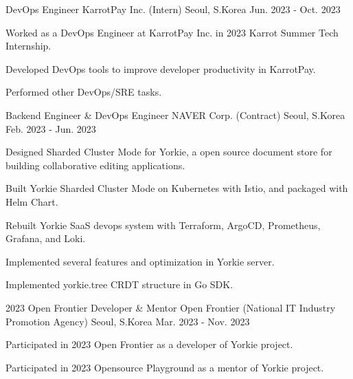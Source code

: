 

\begin{cventries}

\cventry
    {DevOps Engineer} %
    {KarrotPay Inc. (Intern)} %
    {Seoul, S.Korea} %
    {Jun. 2023 - Oct. 2023} %
    {
      \begin{cvitems} %
        \item {Worked as a DevOps Engineer at KarrotPay Inc. in 2023 Karrot Summer Tech Internship.}
        \item {Developed DevOps tools to improve developer productivity in KarrotPay.}
        \item {Performed other DevOps/SRE tasks.}
      \end{cvitems}
    }

  \cventry
    {Backend Engineer \& DevOps Engineer} %
    {NAVER Corp. (Contract)} %
    {Seoul, S.Korea} %
    {Feb. 2023 - Jun. 2023} %
    {
      \begin{cvitems} %
        \item {Designed Sharded Cluster Mode for Yorkie, a open source document store for building collaborative editing applications.}
        \item {Built Yorkie Sharded Cluster Mode on Kubernetes with Istio, and packaged with Helm Chart.}
        \item {Rebuilt Yorkie SaaS devops system with Terraform, ArgoCD, Prometheus, Grafana, and Loki.}
        \item {Implemented several features and optimization in Yorkie server.}
        \item {Implemented yorkie.tree CRDT structure in Go SDK.}
      \end{cvitems}
    }

  \cventry
    {2023 Open Frontier Developer \& Mentor} %
    {Open Frontier (National IT Industry Promotion Agency)} %
    {Seoul, S.Korea} %
    {Mar. 2023 - Nov. 2023} %
    {
      \begin{cvitems} %
        \item {Participated in 2023 Open Frontier as a developer of Yorkie project.}
        \item {Participated in 2023 Opensource Playground as a mentor of Yorkie project.}
      \end{cvitems}
    }


\end{cventries}
